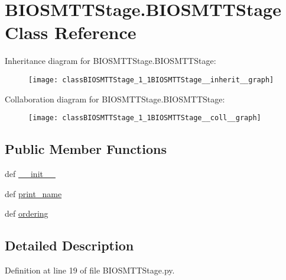\hypertarget{classBIOSMTTStage_1_1BIOSMTTStage}{\section{B\-I\-O\-S\-M\-T\-T\-Stage.\-B\-I\-O\-S\-M\-T\-T\-Stage Class Reference}
\label{classBIOSMTTStage_1_1BIOSMTTStage}
}


Inheritance diagram for B\-I\-O\-S\-M\-T\-T\-Stage.\-B\-I\-O\-S\-M\-T\-T\-Stage\-:\nopagebreak
\begin{figure}[H]
\begin{center}
\leavevmode
\texttt{[image: classBIOSMTTStage\_1\_1BIOSMTTStage\_\_inherit\_\_graph]}
\end{center}
\end{figure}


Collaboration diagram for B\-I\-O\-S\-M\-T\-T\-Stage.\-B\-I\-O\-S\-M\-T\-T\-Stage\-:\nopagebreak
\begin{figure}[H]
\begin{center}
\leavevmode
\texttt{[image: classBIOSMTTStage\_1\_1BIOSMTTStage\_\_coll\_\_graph]}
\end{center}
\end{figure}
\subsection*{Public Member Functions}
\begin{DoxyCompactItemize}
\item 
def \hyperlink{classBIOSMTTStage_1_1BIOSMTTStage_aa5f27b6db5d3b10cbd5d6e47de378e58}{\-\_\-\-\_\-init\-\_\-\-\_\-}
\item 
def \hyperlink{classBIOSMTTStage_1_1BIOSMTTStage_a4e5d3ca4920bd6825cdda7259fa85d52}{print\-\_\-name}
\item 
def \hyperlink{classBIOSMTTStage_1_1BIOSMTTStage_ae46a6ddd03499b39c15d164ea3643e48}{ordering}
\end{DoxyCompactItemize}


\subsection{Detailed Description}


Definition at line 19 of file B\-I\-O\-S\-M\-T\-T\-Stage.\-py.



